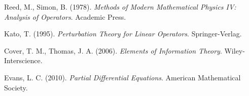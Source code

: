 \documentclass[12pt]{article}
\begin{document}

\begin{thebibliography}{99}

Reed, M., Simon, B. (1978). 
\textit{Methods of Modern Mathematical Physics IV: Analysis of Operators}. 
Academic Press.

Kato, T. (1995). 
\textit{Perturbation Theory for Linear Operators}. 
Springer-Verlag.

Cover, T. M., Thomas, J. A. (2006). 
\textit{Elements of Information Theory}. 
Wiley-Interscience.

Evans, L. C. (2010). 
\textit{Partial Differential Equations}. 
American Mathematical Society.

\end{thebibliography}
\end{document}
